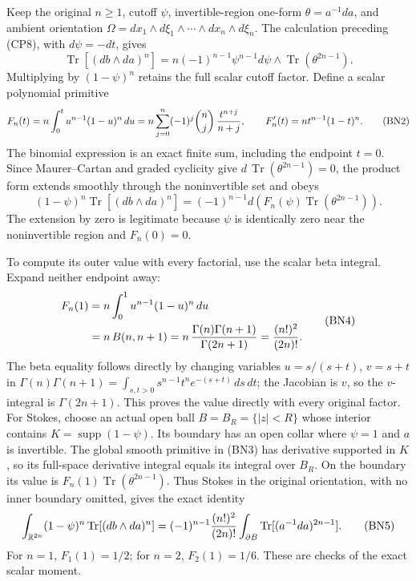\documentclass[
  11pt,
]{article}
\begin{document}
Keep the original \(n\ge1\), cutoff \(\psi\), invertible-region one-form
\(\theta=a^{-1}da\), and ambient orientation
\(\Omega=dx_1\wedge d\xi_1\wedge\cdots\wedge dx_n\wedge d\xi_n\). The
calculation preceding (CP8), with \(d\psi=-dt\), gives \[
 \operatorname{Tr}[(db\wedge da)^n]
   =n(-1)^{n-1}\psi^{n-1}d\psi\wedge
       \operatorname{Tr}(\theta^{2n-1}).
 \tag{BN1}
\] Multiplying by \((1-\psi)^n\) retains the full scalar cutoff factor.
Define a scalar polynomial primitive \[
 F_n(t)
   =n\int_0^t u^{n-1}(1-u)^n\,du
   =n\sum_{j=0}^{n}
       (-1)^j\binom nj\,{t^{n+j}\over n+j},
 \qquad
 F_n'(t)=nt^{n-1}(1-t)^n .
 \tag{BN2}
\] The binomial expression is an exact finite sum, including the
endpoint \(t=0\). Since Maurer--Cartan and graded cyclicity give
\(d\,\operatorname{Tr}(\theta^{2n-1})=0\), the product form extends
smoothly through the noninvertible set and obeys \[
 (1-\psi)^n\operatorname{Tr}[(db\wedge da)^n]
   =(-1)^{n-1}d\!\left(
       F_n(\psi)\operatorname{Tr}(\theta^{2n-1})
     \right).
 \tag{BN3}
\] The extension by zero is legitimate because \(\psi\) is identically
zero near the noninvertible region and \(F_n(0)=0\).

To compute its outer value with every factorial, use the scalar beta
integral. Expand neither endpoint away: \[
 \begin{aligned}
 F_n(1)
 &=n\int_0^1 u^{n-1}(1-u)^n\,du\\
 &=n\,B(n,n+1)
   =n\,{\Gamma(n)\Gamma(n+1)\over\Gamma(2n+1)}
   ={(n!)^2\over(2n)!}.
 \end{aligned}
 \tag{BN4}
\] The beta equality follows directly by changing variables
\(u=s/(s+t)\), \(v=s+t\) in
\(\Gamma(n)\Gamma(n+1)=\int_{s,t>0}s^{n-1}t^n e^{-(s+t)}\,ds\,dt\); the
Jacobian is \(v\), so the \(v\)-integral is \(\Gamma(2n+1)\). This
proves the value directly with every original factor. For Stokes, choose
an actual open ball \(B=B_R=\{|z|<R\}\) whose interior contains
\(K=\operatorname{supp}(1-\psi)\). Its boundary has an open collar where
\(\psi=1\) and \(a\) is invertible. The global smooth primitive in (BN3)
has derivative supported in \(K\), so its full-space derivative integral
equals its integral over \(B_R\). On the boundary its value is
\(F_n(1)\operatorname{Tr}(\theta^{2n-1})\). Thus Stokes in the original
orientation, with no inner boundary omitted, gives the exact identity \[
 \int_{\mathbb R^{2n}}
    (1-\psi)^n\operatorname{Tr}[(db\wedge da)^n]
   =(-1)^{n-1}{(n!)^2\over(2n)!}
      \int_{\partial B}
         \operatorname{Tr}[(a^{-1}da)^{2n-1}].
 \tag{BN5}
\] For \(n=1\), \(F_1(1)=1/2\); for \(n=2\), \(F_2(1)=1/6\). These are
checks of the exact scalar moment.
\end{document}
